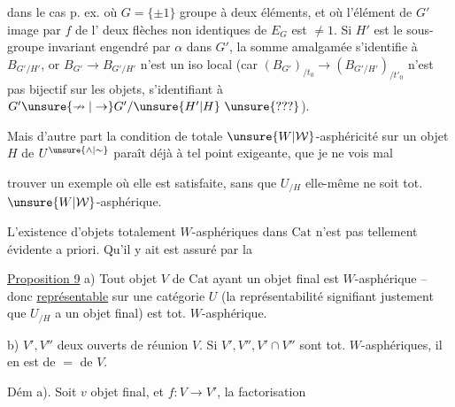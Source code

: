 dans le cas p. ex. où $G=\{\pm1\}$ groupe à deux éléments, et où l'élément \inserted{$\alpha$} de $G'$ image par $f$ de l' deux flèches non identiques de $E_G$ est $\ne1$. Si $H'$ est le sous-groupe invariant engendré par $\alpha$ dans $G'$, la  somme amalgamée s'identifie à $B_{G'/H'}$, or $B_{G'}\to B_{G'/H'}$ n'est  un iso local (car $(B_{G'})_{/t_0}\to(B_{G'/H'})_{/t'_0}$ n'est pas bijectif sur les objets, s'identifiant à $G'\unsure{\nrightarrow|\to}G'/\unsure{H'|H}\ \unsure{???}$).

Mais d'autre part la condition de totale $\unsure{W|\mathcal W}$-asphéricité sur un objet $H$ de $U^{\unsure{\wedge|\sim}}$ paraît déjà à tel point exigeante, que je ne vois mal 

trouver un exemple où elle est satisfaite, sans que $U_{/H}$ elle-même ne soit tot. $\unsure{W|\mathcal W}$-asphérique.

L'existence d'objets  totalement $W$-asphériques dans $\mathrm{Cat}$ n'est pas tellement évidente a priori. Qu'il y  ait  est assuré par la

\uline{Proposition 9} a) Tout objet $V$ de $\mathrm{Cat}$ ayant un objet final est  $W$-asphérique -- donc    \uline{représentable} sur une catégorie $U$ (la représentabilité signifiant justement que $U_{/H}$ a un objet final) est tot. $W$-asphérique.

b)   $V',V''$ deux ouverts de réunion $V$. Si $V',V'',V'\cap V''$ sont tot. $W$-asphériques, il en est de $=$ de $V$.



Dém  a). Soit $v$ \inserted{$*$}  objet final, et $f:V\longrightarrow V'$,  la factorisation


